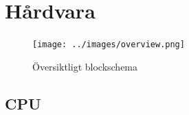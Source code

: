 \documentclass[a4paper,titlepage]{article}
\begin{document}

\newpage
\section{Hårdvara}


\begin{figure}[h!]
	\centering
	\texttt{[image: ../images/overview.png]}
	\caption{Översiktligt blockschema\label{overviewscheme}}
\end{figure}

\subsection{CPU}
\end{document}
